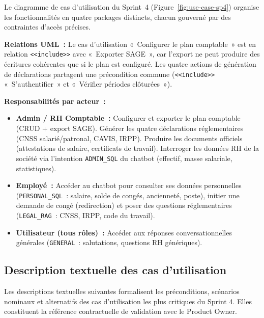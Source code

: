 Le diagramme de cas d'utilisation du Sprint~4 (Figure~\ref{fig:use-case-sp4})
organise les fonctionnalités en quatre packages distincts, chacun
gouverné par des contraintes d'accès précises.

\textbf{Relations UML~:} Le cas d'utilisation «~Configurer le plan
comptable~» est en relation \texttt{<<include>>} avec
«~Exporter SAGE~», car l'export ne peut produire des écritures
cohérentes que si le plan est configuré. Les quatre actions de
génération de déclarations partagent une précondition commune
(\texttt{<<include>>} «~S'authentifier~» et «~Vérifier périodes
clôturées~»).

\textbf{Responsabilités par acteur~:}

\begin{itemize}[label=\textbullet, leftmargin=0.6cm]
    \item \textbf{Admin / RH Comptable~:}
          Configurer et exporter le plan comptable (CRUD +
          export SAGE). Générer les quatre déclarations
          réglementaires (CNSS salarié/patronal, CAVIS, IRPP).
          Produire les documents officiels (attestations de salaire,
          certificats de travail). Interroger les données RH
          de la société via l'intention \texttt{ADMIN\_SQL}
          du chatbot (effectif, masse salariale, statistiques).

    \item \textbf{Employé~:}
          Accéder au chatbot pour consulter ses données personnelles
          (\texttt{PERSONAL\_SQL}~: salaire, solde de congés,
          ancienneté, poste), initier une demande de congé
          (redirection) et poser des questions réglementaires
          (\texttt{LEGAL\_RAG}~: CNSS, IRPP, code du travail).

    \item \textbf{Utilisateur (tous rôles)~:}
          Accéder aux réponses conversationnelles générales
          (\texttt{GENERAL}~: salutations, questions RH génériques).
\end{itemize}

\subsection{Description textuelle des cas d'utilisation}

Les descriptions textuelles suivantes formalisent les préconditions,
scénarios nominaux et alternatifs des cas d'utilisation les plus
critiques du Sprint 4. Elles constituent la référence contractuelle
de validation avec le Product Owner.

